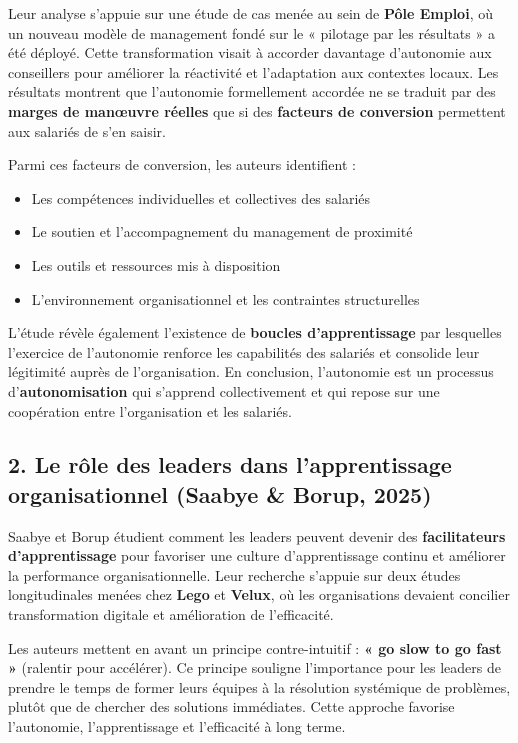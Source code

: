 \documentclass{rapportECL}
\begin{document}
Leur analyse s'appuie sur une étude de cas menée au sein de \textbf{Pôle Emploi}, où un nouveau modèle de management fondé sur le « pilotage par les résultats » a été déployé. Cette transformation visait à accorder davantage d'autonomie aux conseillers pour améliorer la réactivité et l'adaptation aux contextes locaux. Les résultats montrent que l'autonomie formellement accordée ne se traduit par des \textbf{marges de manœuvre réelles} que si des \textbf{facteurs de conversion} permettent aux salariés de s'en saisir.

Parmi ces facteurs de conversion, les auteurs identifient :
\begin{itemize}
\item Les compétences individuelles et collectives des salariés
\item Le soutien et l'accompagnement du management de proximité
\item Les outils et ressources mis à disposition
\item L'environnement organisationnel et les contraintes structurelles
\end{itemize}

L'étude révèle également l'existence de \textbf{boucles d'apprentissage} par lesquelles l'exercice de l'autonomie renforce les capabilités des salariés et consolide leur légitimité auprès de l'organisation. En conclusion, l'autonomie est un processus d'\textbf{autonomisation} qui s'apprend collectivement et qui repose sur une coopération entre l'organisation et les salariés.

\subsection*{2. Le rôle des leaders dans l'apprentissage organisationnel (Saabye \& Borup, 2025)}

Saabye et Borup étudient comment les leaders peuvent devenir des \textbf{facilitateurs d'apprentissage} pour favoriser une culture d'apprentissage continu et améliorer la performance organisationnelle. Leur recherche s'appuie sur deux études longitudinales menées chez \textbf{Lego} et \textbf{Velux}, où les organisations devaient concilier transformation digitale et amélioration de l'efficacité.

Les auteurs mettent en avant un principe contre-intuitif : \textbf{« go slow to go fast »} (ralentir pour accélérer). Ce principe souligne l'importance pour les leaders de prendre le temps de former leurs équipes à la résolution systémique de problèmes, plutôt que de chercher des solutions immédiates. Cette approche favorise l'autonomie, l'apprentissage et l'efficacité à long terme.
\end{document}
